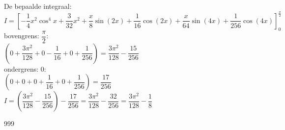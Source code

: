 \documentclass[a4paper]{article}
\begin{document}
De bepaalde integraal: \\

$I = \left[ -\dfrac{1}{4} x^{2} \cos^{4} x + \dfrac{3}{32} x^{2} + \dfrac{x}{8} \sin(2x) + \dfrac{1}{16} \cos(2x) + \dfrac{x}{64} \sin(4x) + \dfrac{1}{256} \cos(4x) \right]_{0}^{\tfrac{\pi}{2}}$ \\

bovengrens: $\dfrac{\pi}{2}$: \\

$\left( 0 + \dfrac{3\pi^{2}}{128} + 0 - \dfrac{1}{16} + 0 + \dfrac{1}{256} \right) = \dfrac{3\pi^{2}}{128} - \dfrac{15}{256}$ \\

ondergrens: $0$: \\

$\left( 0 + 0 + 0 + \dfrac{1}{16} + 0 + \dfrac{1}{256} \right) = \dfrac{17}{256}$ \\

$I = \left( \dfrac{3\pi^{2}}{128} - \dfrac{15}{256} \right) - \dfrac{17}{256} = \dfrac{3\pi^{2}}{128} - \dfrac{32}{256} = \dfrac{3\pi^{2}}{128} - \dfrac{1}{8}$ \\

\begin{thebibliography}{999}
\end{thebibliography}
\end{document}
